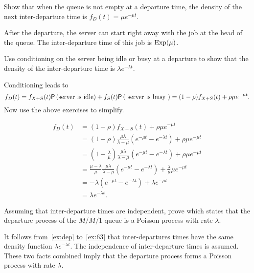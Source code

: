\begin{extra}
Show that when the queue is not empty at a departure time, the density of the next inter-departure time is $f_D(t) = \mu e^{-\mu t}$.
\begin{solution}
After the departure, the server can start right away with the job at the head of the queue. The inter-departure time of this job is $\operatorname{Exp}(\mu)$.
\end{solution}
\end{extra}

\begin{extra}
Use conditioning on the server being idle or busy at a departure to show that the density of the inter-departure time is $\lambda e^{-\lambda t}$.
\begin{hint}
Conditioning leads to 
\begin{equation*}
 f_D(t) = f_{X+S}(t) \P{\text{server is idle}} + f_S(t) \P{\text{ server is busy }}= (1-\rho) f_{X+S}(t) +
 \rho \mu e^{-\mu t}.
\end{equation*}
 Now use the above exercises to simplify.
\end{hint}
\begin{solution}
 \begin{align*}
 f_D(t) 
&= (1-\rho) f_{X+S}(t) + \rho \mu e^{-\mu t} \\
&= (1-\rho) \frac{\mu\lambda}{\lambda-\mu} \left(e^{-\mu t}-e^{-\lambda t}\right) + \rho \mu e^{-\mu t} \\
&= \left(1-\frac{\lambda}\mu\right) \frac{\mu\lambda}{\lambda-\mu}\left(e^{-\mu t}-e^{-\lambda t}\right) + \rho \mu e^{-\mu t} \\
&= \frac{\mu-\lambda}\mu \frac{\mu\lambda}{\lambda-\mu}\left(e^{-\mu t}-e^{-\lambda t}\right) + \frac\lambda \mu \mu e^{-\mu t} \\
&= - \lambda\left(e^{-\mu t}-e^{-\lambda t}\right) + \lambda e^{-\mu t} \\
&= \lambda e^{-\lambda t}.
 \end{align*}
\end{solution}
\end{extra}


\begin{exercise}
Assuming that  inter-departure times are independent,  prove  which states that the departure process of the $M/M/1$ queue is a Poisson process with rate $\lambda$.
\begin{solution}
  It follows from~\cref{ex:dep} to~\cref{ex:63} that inter-departures times have the same density function $\lambda e^{-\lambda t}$.
  The independence of inter-departure times is assumed.
  These two facts combined imply that the departure process forms a Poisson process with rate $\lambda$.
\end{solution}
\end{exercise}


